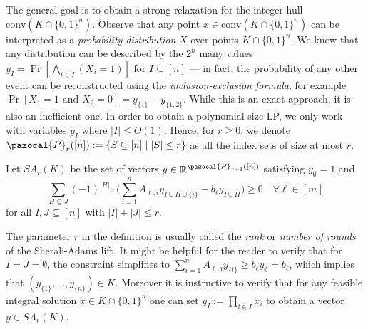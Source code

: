 The general goal is to obtain a strong relaxation for the integer hull $\textrm{conv}( K \cap \{ 0,1\}^n)$.
Observe that any point $x \in \textrm{conv}( K \cap \{ 0,1\}^n)$ can be interpreted as a \emph{probability distribution} $X$ over points $K \cap \{ 0,1\}^n$. We know that any distribution can be described by the $2^n$ many values
$y_{I} = \Pr[\bigwedge_{i \in I}(X_i=1)]$ for $I \subseteq [n]$ --- in fact, the probability of any other event can be reconstructed
using the \emph{inclusion-exclusion formula}, for example $\Pr[X_1=1\textrm{ and }X_2=0] = y_{\{1\}}-y_{\{1,2\}}$.
While this is an exact approach, it is also an inefficient one.
In order to obtain a polynomial-size LP, we only work with variables $y_I$ where $|I| \leq O(1)$. 
Hence, for $r \geq 0$, we denote $\pazocal{P}_r([n]) := \{ S \subseteq [n] \mid |S| \leq r\}$ as all the index sets of size at most $r$.

\begin{definition}
  Let $SA_r(K)$ be the set of vectors $y \in \setR^{\pazocal{P}_{r+1}([n])}$ satisfying $y_{\emptyset} = 1$ and
  \[
 \sum_{H \subseteq J} (-1)^{|H|} \cdot \Big(\sum_{i=1}^n A_{\ell,i}y_{I \cup H \cup \{ i\}} - b_{\ell}y_{I \cup H}\Big) \geq 0 \quad \forall \ell \in [m]
\]
for all $I,J \subseteq [n]$ with $|I| + |J| \leq r$.
\end{definition}
The parameter $r$ in the definition is usually called the \emph{rank} or \emph{number of rounds} of the Sherali-Adams
lift.
It might be helpful for the reader to verify that for $I=J=\emptyset$, the constraint simplifies to $\sum_{i=1}^n A_{\ell,i}y_{\{ i\}} \geq b_{\ell}y_{\emptyset}=b_{\ell}$,
which implies that $(y_{\{1\}},\ldots,y_{\{n\}}) \in K$. Moreover it is instructive to verify that for any feasible integral solution  $x \in K \cap \{ 0,1\}^n$ one can set
$y_{I} := \prod_{i \in I} x_i$ to obtain a vector $y \in SA_r(K)$.



